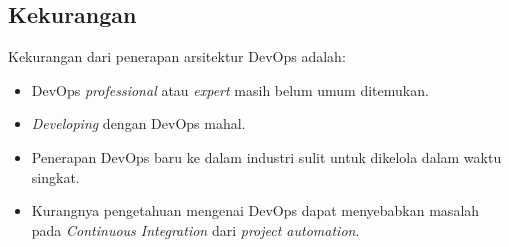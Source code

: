 \subsection{Kekurangan}
Kekurangan dari penerapan arsitektur DevOps adalah:
\begin{itemize}
	\item DevOps \textit{professional} atau \textit{expert} masih belum umum ditemukan.
	\item \textit{Developing} dengan DevOps mahal.
	\item Penerapan DevOps baru ke dalam industri sulit untuk dikelola dalam waktu singkat.
	\item 	Kurangnya pengetahuan mengenai DevOps dapat menyebabkan masalah pada \textit{Continuous Integration} dari \textit{project automation}.
\end{itemize}
